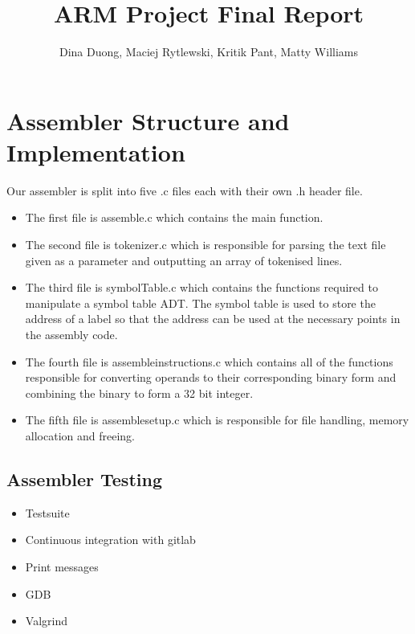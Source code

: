\documentclass[11pt]{article}
\begin{document}
\title{
    \vspace{-2cm}
    ARM Project Final Report}
\author{Dina Duong, Maciej Rytlewski, Kritik Pant, Matty Williams}

\maketitle

\section{Assembler Structure and Implementation}

Our assembler is split into five .c files each with their own .h header file.

\begin{itemize}
    \item The first file is assemble.c which contains the main function.
    \item The second file is tokenizer.c which is responsible for parsing the text file given as a parameter and outputting an array of tokenised lines.
    \item The third file is symbolTable.c which contains the functions required to manipulate a symbol table ADT. The symbol table is used to store the address of a label so that the address can be used at the necessary points in the assembly code.
    \item The fourth file is assembleinstructions.c which contains all of the functions responsible for converting operands to their corresponding binary form and combining the binary to form a 32 bit integer.
    \item The fifth file is assemblesetup.c which is responsible for file handling, memory allocation and freeing. 
\end{itemize}

\subsection{Assembler Testing}

\begin{itemize}
    \item Testsuite
    \item Continuous integration with gitlab
    \item Print messages
    \item GDB
    \item Valgrind
\end{itemize}
\end{document}
